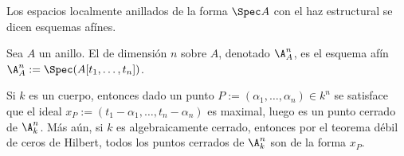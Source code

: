 \begin{mydef}
	Los espacios localmente anillados de la forma $\Spec A$ con el haz estructural se dicen esquemas afínes.
\end{mydef}
\begin{mydef}
	Sea $A$ un anillo.
	El  de dimensión $n$ sobre $A$, denotado $\A^n_A$, es el esquema afín $\A^n_A := \Spec(A[t_1, \dots, t_n])$.
\end{mydef}
\begin{ex}
	Si $k$ es un cuerpo, entonces dado un punto $P := (\alpha_1, \dots, \alpha_n) \in k^n$ se satisface que
	el ideal $x_P := (t_1 - \alpha_1, \dots, t_n - \alpha_n)$ es maximal, luego es un punto cerrado de $\A^n_k$.
	Más aún, si $k$ es algebraicamente cerrado, entonces por el teorema débil de ceros de Hilbert, todos los puntos cerrados de $\A^n_k$ son de la forma $x_P$.
\end{ex}

